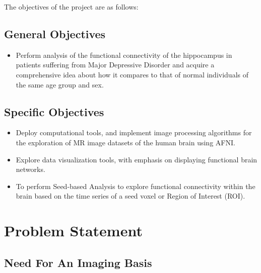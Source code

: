 ﻿\documentclass[12pt]{article}
\begin{document}
The objectives of the project are as follows:

\subsection{General Objectives}

\begin{itemize}

  \item Perform analysis of the functional connectivity of the
    hippocampus in patients suffering from Major Depressive Disorder
    and acquire a comprehensive idea about how it compares to that of
    normal individuals of the same age group and sex.

\end{itemize}

\subsection{Specific Objectives}

\begin{itemize}

  \item Deploy computational tools, and implement image processing
    algorithms for the exploration of MR image datasets of the human
    brain using AFNI.

  \item Explore data visualization tools, with emphasis on displaying
    functional brain networks.

  \item To perform Seed-based Analysis  to explore functional
    connectivity within the brain based on the time series of a seed
    voxel or Region of Interest (ROI).

\end{itemize}


\newpage

\section{Problem Statement} %

\subsection{Need For An Imaging Basis} %
\end{document}
